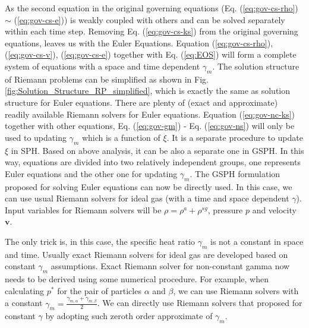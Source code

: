 As the second equation in the original governing equations (Eq. (\ref{eq:gov-cs-rho}) $\sim$ (\ref{eq:gov-cs-e})) is weakly coupled with others and can be solved separately within each time step. Removing Eq. (\ref{eq:gov-cs-ks}) from the original governing equations, leaves us with the Euler Equations. Equation (\ref{eq:gov-cs-rho}), (\ref{eq:gov-cs-v}), (\ref{eq:gov-cs-e}) together with Eq. (\ref{eq:EOS}) will form a complete system of equations with a space and time dependent $\gamma_{m}$. The solution structure of Riemann problems can be simplified as shown in Fig. \ref{fig:Solution_Structure_RP_simplified}, which is exactly the same as solution structure for Euler equations. There are plenty of (exact and approximate) readily available Riemann solvers for Euler equations. Equation (\ref{eq:gov-nc-ks}) together with other equations, Eq. (\ref{eq:gov-gm}) - Eq. (\ref{eq:gov-ns}) will only be used to updating $\gamma_{m}$ which is a function of $\xi$. It is a separate procedure to update $\xi$ in SPH. Based on above analysis, it can be also a separate one in GSPH. In this way, equations are divided into two relatively independent groups, one represents Euler equations and the other one for updating $\gamma_{m}$.
The GSPH formulation \citep{inutsuka2002reformulation} proposed for solving Euler equations can now be directly used. In this case, we can use usual Riemann solvers for ideal gas (with a time and space dependent $\gamma$). Input variables for Riemann solvers will be $\rho=\rho^a + \rho^{sg}$, pressure $p$ and velocity $\textbf{v}$.
 
The only trick is, in this case, the specific heat ratio $\gamma_{m}$ is not a constant in space and time. Usually exact Riemann solvers for ideal gas are developed based on constant $\gamma_{m}$ assumptions. Exact Riemann solver for non-constant gamma now needs to be derived using some numerical procedure. For example, when calculating $p^{\ast}$ for the pair of particles $\alpha$ and $\beta$, we can use Riemann solvers with a constant $\gamma_{m}=\frac{\gamma_{m,\alpha}+\gamma_{m,\beta}}{2}$. We can directly use Riemann solvers that proposed for constant $\gamma$ by adopting such zeroth order approximate of $\gamma_m$.